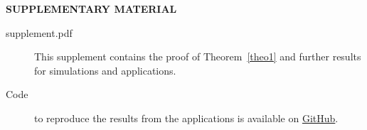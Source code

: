 \documentclass[12pt]{article}
\theoremstyle{plain}
\begin{document}


\begin{center}
{\large\bf SUPPLEMENTARY MATERIAL}
\end{center}
\begin{description}

\item[supplement.pdf] This supplement contains the proof of Theorem~\ref{theo1} and further results for simulations and applications.
\item[Code]  to reproduce the results from the applications is available on \href{https://github.com/manucarl/BCTM}{GitHub}. %
\end{description}


\end{document}

